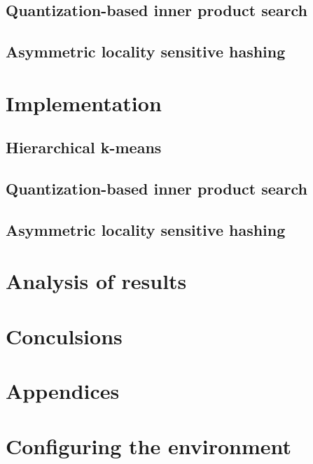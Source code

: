 \documentclass[12pt]{article}
\begin{document}
	\subsection{Quantization-based inner product search}
	
	\subsection{Asymmetric locality sensitive hashing}
	
\section{Implementation}
	
	\subsection{Hierarchical k-means}
	
	\subsection{Quantization-based inner product search}
	
	\subsection{Asymmetric locality sensitive hashing}
	
\section{Analysis of results}
	
\section{Conculsions}
	


\newpage
\section{Appendices}
\label{sec:appendices}
\appendix
\section{Configuring the environment}
	
\end{document}
